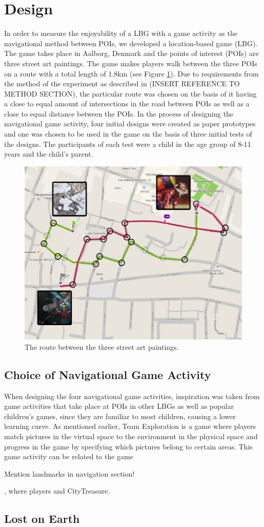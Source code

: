 \section{Design}
In order to measure the enjoyability of a LBG with a game activity as the navigational method between POIs, we developed a location-based game (LBG). The game takes place in Aalborg, Denmark and the points of interest (POIs) are three street art paintings\cite{streetart}. The game makes players walk between the three POIs on a route with a total length of 1.8km (see Figure \ref{FinalRoute}). Due to requirements from the method of the experiment as described in (INSERT REFERENCE TO METHOD SECTION), the particular route was chosen on the basis of it having a close to equal amount of intersections in the road between POIs as well as a close to equal distance between the POIs. In the process of designing the navigational game activity, four initial designs were created as paper prototypes and one was chosen to be used in the game on the basis of three initial tests of the designs. The participants of each test were a child in the age group of 8-11 years and the child's parent.

\begin{figure}[hbtp]
\centering
\includegraphics[scale=0.3]{Pics/FinalRoute.png}
\caption{The route between the three street art paintings.}
\label{FinalRoute}
\end{figure}

\subsection{Choice of Navigational Game Activity}
When designing the four navigational game activities, inspiration was taken from game activities that take place at POIs in other LBGs as well as popular children's games, since they are familiar to most children, causing a lower learning curve. As mentioned earlier, Team Exploration\cite{GamingOnTheMove} is a game where players match pictures in the virtual space to the environment in the physical space and progress in the game by specifying which pictures belong to certain areas. This game activity can be related to the game 

Mention landmarks in navigation section!

 , where players  and CityTreasure\cite{botturi2009city}. 

\subsection{Lost on Earth}

